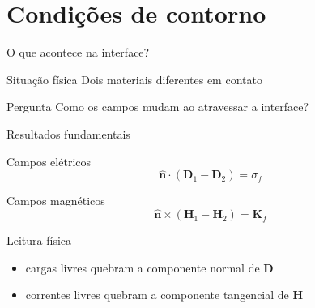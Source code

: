 \documentclass[aspectratio=169]{beamer}
\begin{document}

\section{Condições de contorno}

\begin{frame}{O que acontece na interface?}

\begin{block}{Situação física}
Dois materiais diferentes em contato
\end{block}

\pause

\begin{block}{Pergunta}
Como os campos mudam ao atravessar a interface?
\end{block}

\end{frame}


\begin{frame}{Resultados fundamentais}

\begin{block}{Campos elétricos}
\begin{equation}
\hat{\mathbf n}\cdot(\mathbf{D}_1-\mathbf{D}_2)=\sigma_f
\end{equation}
\end{block}

\pause

\begin{block}{Campos magnéticos}
\begin{equation}
\hat{\mathbf n}\times(\mathbf{H}_1-\mathbf{H}_2)=\mathbf{K}_f
\end{equation}
\end{block}

\pause

\begin{alertblock}{Leitura física}
\begin{itemize}
\item cargas livres quebram a componente normal de \(\mathbf D\)
\item correntes livres quebram a componente tangencial de \(\mathbf H\)
\end{itemize}
\end{alertblock}

\end{frame}

\end{document}
